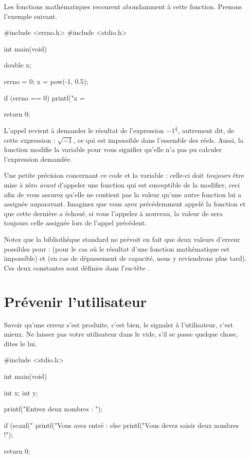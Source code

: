 Les fonctions mathématiques recourent abondamment à cette fonction.
Prenons l'exemple suivant.

\begin{C}

#include <errno.h>
#include <stdio.h>


int main(void)
{
    double x;

    errno = 0;
    x = pow(-1, 0.5);

    if (errno == 0)
        printf("x = %

    return 0;
}
\end{C}

L'appel revient à demander le résultat de l'expression
\(-1^\frac{1}{2}\), autrement dit, de cette expression : \(\sqrt{-1}\),
ce qui est impossible dans l'essemble des réels. Aussi, la fonction
 modifie la variable  pour vous signifier
qu'elle n'a pas pu calculer l'expression demandée.

Une petite précision concernant ce code et la variable  :
celle-ci doit \emph{toujours} être mise à zéro \emph{avant} d'appeler
une fonction qui est susceptible de la modifier, ceci afin de vous
assurez qu'elle ne contient pas la valeur qu'une autre fonction lui a
assignée auparavant. Imaginez que vous ayez précédemment appelé la
fonction  et que cette dernière a échoué, si vous
l'appelez à nouveau, la valeur de  sera toujours celle
assignée lors de l'appel précédent.

\begin{infobox}
 Notez que la bibliothèque standard ne
prévoit en fait que deux valeurs d'erreur possibles pour 
:  (pour le cas où le résultat d'une fonction mathématique
est impossible) et  (en cas de dépassement de capacité,
nous y reviendrons plus tard). Ces deux constantes sont définies dans
l'en-tête . 
\end{infobox}

\section{Prévenir l'utilisateur}
\label{prevenir-l-utilisateur}

Savoir qu'une erreur s'est produite, c'est bien, le signaler à
l'utilisateur, c'est mieux. Ne laisser pas votre utilisateur dans le
vide, s'il se passe quelque chose, dites le lui.

\begin{C}
#include <stdio.h>


int main(void)
{
    int x;
    int y;

    printf("Entrez deux nombres : ");

    if (scanf("%
        printf("Vous avez entré : %
    else
        printf("Vous devez saisir deux nombres !\n");

    return 0;
}

\end{C}

